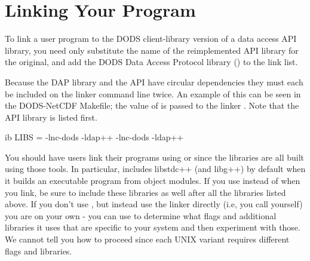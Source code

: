 %
%

\chapter{Linking Your Program}
\label{pguide,linking}
\label{tk,linking}

To link a user program to the DODS client-library version of a data
access API library, you need only substitute the name of the
reimplemented API library for the original, and add the DODS Data
Access Protocol library () to the link list.

Because the DAP library and the API have circular dependencies they
must each be included on the linker command line twice. An example of
this can be seen in the DODS-NetCDF Makefile; the value of 
is passed to the linker . Note that the API library is listed
first.

\begin{vcode}{ib}
LIBS = -lnc-dods -ldap++ -lnc-dods -ldap++ 
\end{vcode}

You should have users link their programs using  or 
since the libraries are all built using those tools. In particular,
 includes libstdc++ (and libg++) by default when it builds an
executable program from object modules. If you use  instead
of  when you link, be sure to include these libraries as well
after all the libraries listed above. If you don't use , but
instead use the linker directly (i.e, you call  yourself) you
are on your own - you can use  to determine what flags and
additional libraries it uses that are specific to your system and then
experiment with those. We cannot tell you how to proceed since each
UNIX variant requires different flags and libraries.

%
%
%
%

